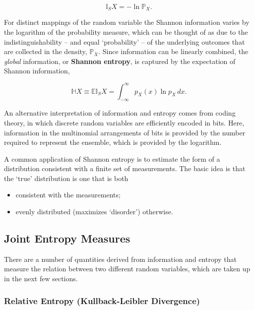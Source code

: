 \documentclass[12pt, twoside, draft]{article}
\begin{document}
\begin{equation}\label{eq:Shannon_information}
\mathbb{I}_S X = -\ln\mathbb{P}_X.
\end{equation}

For distinct mappings of the random variable the Shannon information varies by the logarithm of the probability measure, which can be thought of as due to the indistinguishability -- and equal `probability' -- of the underlying outcomes that are collected in the density, $\mathbb{P}_X$.  Since information can be linearly combined, the \textit{global} information, or \textbf{Shannon entropy}, is captured by the expectation of Shannon information,

\begin{equation}\label{eq:Shannon_entropy}
\mathbb{H}X \equiv \mathbb{E}\mathbb{I}_S X = \int_{-\infty}^\infty p_X(x) \ln p_X\,dx.
\end{equation}

An alternative interpretation of information and entropy comes from coding theory, in which discrete random variables are efficiently encoded in bits. Here, information in the multinomial arrangements of bits is provided by the number required to represent the ensemble, which is provided by the logarithm.

A common application of Shannon entropy is to estimate the form of a distribution consistent with a finite set of measurements.  The basic idea is that the `true' distribution is one that is both

\begin{itemize}[noitemsep]
\item consistent with the measurements;
\item evenly distributed (maximizes `disorder') otherwise.
\end{itemize}

\subsection{Joint Entropy Measures}

There are a number of quantities derived from information and entropy that measure the relation between two different random variables, which are taken up in the next few sections.

\subsubsection{Relative Entropy (Kullback-Leibler Divergence)}\label{sec:Kullback-Leibler_divergence}
\end{document}
